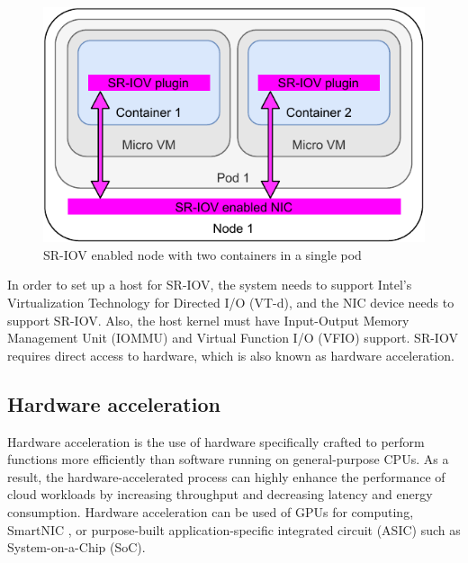 \begin{figure}[ht]
  \begin{center}
    \includegraphics[width=13.5cm]{images/SR-IOVNode.pdf}
    \caption{SR-IOV enabled node with two containers in a single pod}
    \label{fig:SR-IOVNode}
  \end{center}
\end{figure}

In order to set up a host for SR-IOV, the system needs to support Intel's Virtualization Technology for Directed I/O (VT-d), and the NIC device needs to support SR-IOV. Also, the host kernel must have Input-Output Memory Management Unit (IOMMU) and Virtual Function I/O (VFIO) support. SR-IOV requires direct access to hardware, which is also known as hardware acceleration.

\subsection{Hardware acceleration}

Hardware acceleration is the use of hardware specifically crafted to perform functions more efficiently than software running on general-purpose CPUs. As a result, the hardware-accelerated process can highly enhance the performance of cloud workloads by increasing throughput and decreasing latency and energy consumption. Hardware acceleration can be used of GPUs for computing, SmartNIC \cite{SmartNICIntel}, or purpose-built application-specific integrated circuit (ASIC) such as System-on-a-Chip (SoC).

